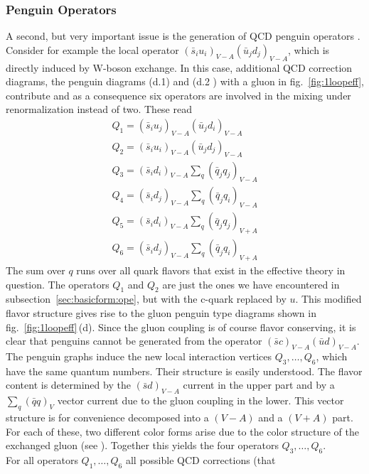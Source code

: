 \subsubsection{Penguin Operators}
               \label{sec:basicform:rg:pop}
A second, but very important issue is the generation of QCD penguin
operators \cite{vainshtein:77}. Consider for example the local
operator $(\bar s_iu_i)_{V-A}(\bar u_jd_j)_{V-A}$, which is directly
induced by W-boson exchange. In this case, additional QCD correction
diagrams, the penguin diagrams (d.1) and (d.2 ) with a gluon in
fig.\ \ref{fig:1loopeff}, contribute and as a consequence six operators
are involved in the mixing under renormalization instead of two. These
read
\begin{equation}\label{q16}
\begin{array}{rcl}
Q_1=(\bar s_iu_j)_{V-A}(\bar u_jd_i)_{V-A} \\
Q_2=(\bar s_iu_i)_{V-A}(\bar u_jd_j)_{V-A} \\
Q_3=(\bar s_id_i)_{V-A}\sum_q(\bar q_jq_j)_{V-A} \\
Q_4=(\bar s_id_j)_{V-A}\sum_q(\bar q_jq_i)_{V-A} \\
Q_5=(\bar s_id_i)_{V-A}\sum_q(\bar q_jq_j)_{V+A} \\
Q_6=(\bar s_id_j)_{V-A}\sum_q(\bar q_jq_i)_{V+A}
\end{array}
\end{equation}
The sum over $q$ runs over all quark flavors that exist in the
effective theory in question. The operators $Q_1$ and $Q_2$ are just
the ones we have encountered in subsection~\ref{sec:basicform:ope}, but with
the c-quark replaced by $u$. This modified flavor structure gives rise to
the gluon penguin type diagrams shown in fig.\ \ref{fig:1loopeff}\,(d).
Since the gluon coupling is of course flavor conserving, it is clear
that penguins cannot be generated from the operator $(\bar
sc)_{V-A}(\bar ud)_{V-A}$. The penguin graphs induce the new local
interaction vertices $Q_3,\ldots, Q_6$, which have the same quantum
numbers. Their structure is easily understood. The flavor content is
determined by the $(\bar sd)_{V-A}$ current in the upper part and by a
$\sum_q(\bar qq)_V$ vector current due to the gluon coupling in the
lower. This vector structure is for convenience decomposed into a
$(V-A)$ and a $(V+A)$ part. For each of these, two different color
forms arise due to the color structure of the exchanged gluon (see
). Together this yields the four operators $Q_3,\ldots,
Q_6$.\\
For all operators $Q_1,\ldots, Q_6$ all possible QCD corrections (that
